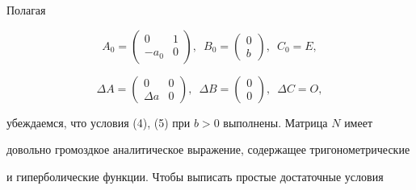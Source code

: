 Полагая


$$


A_0= \left( 


\begin{array}{cc}


0 & 1 \\


-a_0 & 0 


\end{array}


\right), 


\, \, \, 


B_0= \left( 


\begin{array}{c}


0 \\


b 


\end{array}


\right), 


\, \, \, 


C_0=E, 


$$


$$


\Delta A= \left( 


\begin{array}{cc}


0 & 0 \\


\Delta a & 0 


\end{array}


\right), 


\, \, \, 


\Delta B= \left( 


\begin{array}{c}


0 \\


0 


\end{array}


\right), 


\, \, \, 


\Delta C=O,


$$


убеждаемся, что условия (4), (5) при $b>0$ выполнены. Матрица $N$ имеет


довольно громоздкое аналитическое выражение, содержащее тригонометрические


и гиперболические функции. Чтобы выписать простые достаточные условия


